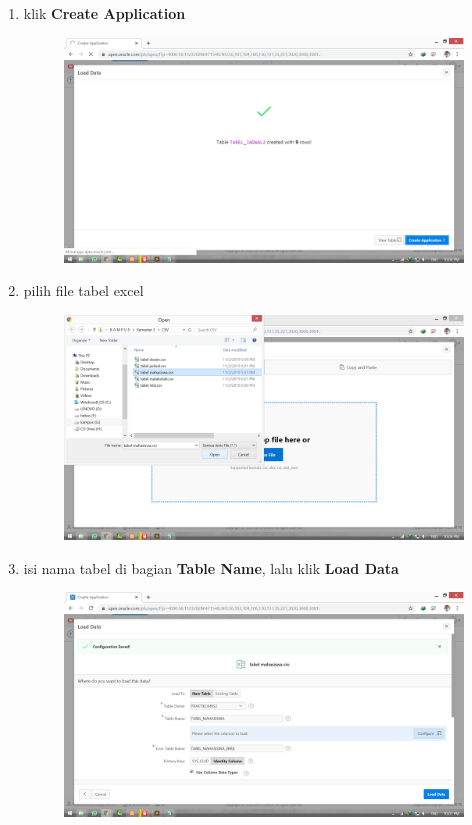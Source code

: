 \documentclass[11pt]{article}
\begin{document}
\begin{enumerate}
\item klik \textbf{Create Application}
	\begin{figure}[h]
        \centerline{\includegraphics[scale=0.1]{img/15.png}}
        \centering
        \caption{}
		\label{langkah21}
	\end{figure}

\newpage
\item pilih file tabel excel
	\begin{figure}[h]
        \centerline{\includegraphics[scale=0.1]{img/16.png}}
        \centering
        \caption{}
		\label{langkah22}
	\end{figure}
	
\item isi nama tabel di bagian \textbf{Table Name}, lalu klik \textbf{Load Data}
	\begin{figure}[h]
        \centerline{\includegraphics[scale=0.1]{img/17.png}}
        \centering
        \caption{}
		\label{langkah23}
	\end{figure}
	

\end{enumerate}
\end{document}
